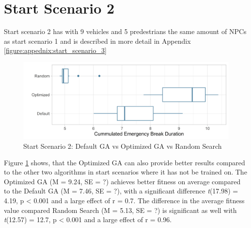 \section{Start Scenario 2}
Start scenario 2 has with 9 vehicles and 5 predestrians the same amount of NPCs as start scenario 1 and is described in more detail in Appendix \ref{figure:appednix:start_scenario_3}

\begin{figure}[ht] 
	\label{figure:sim_2_comparison}
	\includegraphics[width=1\linewidth]{simulations/evaluation/plots/sim_2_comparison}
	\caption{Start Scenario 2: Default GA vs Optimized GA vs Random Search}
\end{figure}

Figure \ref{figure:sim_2_comparison} shows, that the Optimized GA can also provide better results compared to the other two algorithms in start scenarios where it has not be trained on. The Optimized GA (M = 9.24, SE = ?) achieves better fitness on average compared to the Default GA (M = 7.46, SE = ?), with a significant difference \textit{t}(17.98) = 4.19, p < 0.001 and a large effect of r = 0.7. The difference in the average fitness value compared Random Search (M = 5.13, SE = ?) is significant as well with \textit{t}(12.57) = 12.7, p < 0.001 and a large effect of r = 0.96.

